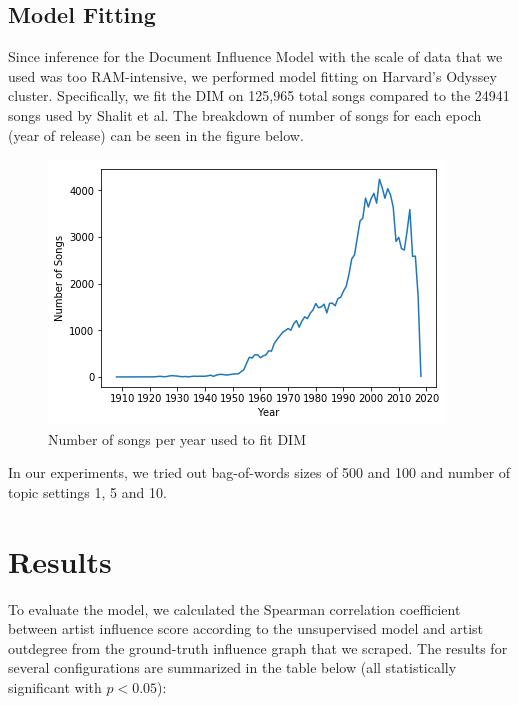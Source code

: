 \subsection{Model Fitting}
Since inference for the Document Influence Model with the scale of data that we used was too RAM-intensive, we performed model fitting on Harvard's Odyssey cluster. Specifically, we fit the DIM on 125,965 total songs compared to the 24941 songs used by Shalit et al. The breakdown of number of songs for each epoch (year of release) can be seen in the figure below. 

\begin{figure}[H]
\includegraphics[width=\textwidth]{figures/dim_songs_epoch.png}
\caption{Number of songs per year used to fit DIM}
\end{figure}

In our experiments, we tried out bag-of-words sizes of 500 and 100 and number of topic settings 1, 5 and 10.

\section{Results}
To evaluate the model, we calculated the Spearman correlation coefficient between artist influence score according to the unsupervised model and artist outdegree from the ground-truth influence graph that we scraped. The results for several configurations are summarized in the table below (all statistically significant with $p < 0.05$):


